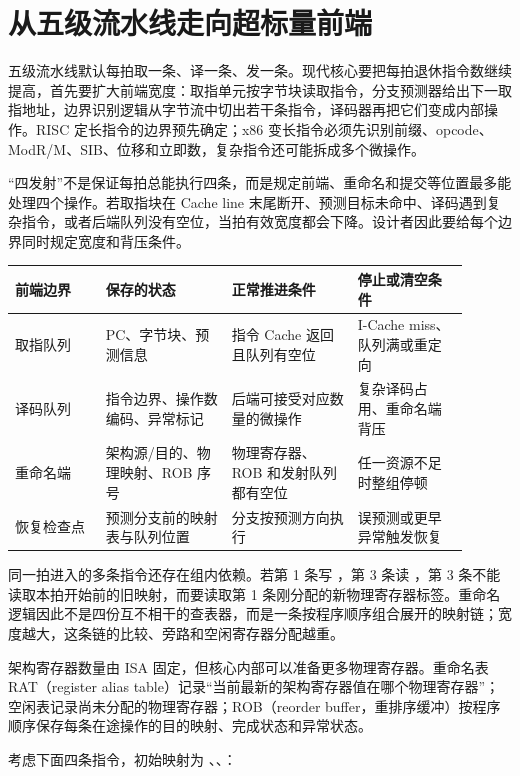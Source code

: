 \section{从五级流水线走向超标量前端}

五级流水线默认每拍取一条、译一条、发一条。现代核心要把每拍退休指令数继续提高，首先要扩大前端宽度：取指单元按字节块读取指令，分支预测器给出下一取指地址，边界识别逻辑从字节流中切出若干条指令，译码器再把它们变成内部操作。RISC 定长指令的边界预先确定；x86 变长指令必须先识别前缀、opcode、ModR/M、SIB、位移和立即数，复杂指令还可能拆成多个微操作。

“四发射”不是保证每拍总能执行四条，而是规定前端、重命名和提交等位置最多能处理四个操作。若取指块在 Cache line 末尾断开、预测目标未命中、译码遇到复杂指令，或者后端队列没有空位，当拍有效宽度都会下降。设计者因此要给每个边界同时规定宽度和背压条件。

\begin{longtable}{L{0.18\linewidth}L{0.25\linewidth}L{0.25\linewidth}L{0.22\linewidth}}
\toprule
前端边界 & 保存的状态 & 正常推进条件 & 停止或清空条件 \\
\midrule
取指队列 & PC、字节块、预测信息 & 指令 Cache 返回且队列有空位 & I-Cache miss、队列满或重定向 \\
译码队列 & 指令边界、操作数编码、异常标记 & 后端可接受对应数量的微操作 & 复杂译码占用、重命名端背压 \\
重命名端 & 架构源/目的、物理映射、ROB 序号 & 物理寄存器、ROB 和发射队列都有空位 & 任一资源不足时整组停顿 \\
恢复检查点 & 预测分支前的映射表与队列位置 & 分支按预测方向执行 & 误预测或更早异常触发恢复 \\
\bottomrule
\end{longtable}

同一拍进入的多条指令还存在组内依赖。若第 1 条写 ，第 3 条读 ，第 3 条不能读取本拍开始前的旧映射，而要读取第 1 条刚分配的新物理寄存器标签。重命名逻辑因此不是四份互不相干的查表器，而是一条按程序顺序组合展开的映射链；宽度越大，这条链的比较、旁路和空闲寄存器分配越重。


架构寄存器数量由 ISA 固定，但核心内部可以准备更多物理寄存器。重命名表 RAT（register alias table）记录“当前最新的架构寄存器值在哪个物理寄存器”；空闲表记录尚未分配的物理寄存器；ROB（reorder buffer，重排序缓冲）按程序顺序保存每条在途操作的目的映射、完成状态和异常状态。

考虑下面四条指令，初始映射为 、、：

